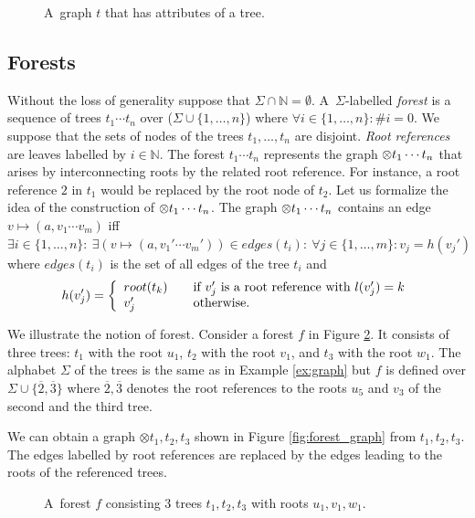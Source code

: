 	\begin{figure}[bth]
		\begin{center}
			
		\end{center}
		\caption{A~graph $t$ that has attributes of a tree.}
		\label{fig:graph_tree}
	\end{figure}
	\label{ex:graph}
\eexmp

\subsection{Forests}
\label{subsec:forests}

Without the loss of generality suppose that $\Sigma \cap \mathbb{N} = \emptyset$.
A~$\Sigma$-labelled \emph{forest} is a sequence of trees $t_1 \cdots t_n$ over ($\Sigma \cup \{1,\ldots,n\}$)
where $\forall i \in \{1,\ldots,n\}: \#i = 0$.
We suppose that the sets of nodes of the trees $t_1, \ldots, t_n$ are disjoint.
\emph{Root references} are leaves labelled by $i \in \mathbb{N}$.
The forest $t_1 \cdots t_n$ represents the graph $\otimes t_1 \cdots t_n$ that arises
by interconnecting roots by the related root reference.
For instance, a root reference $2$ in $t_1$ would be replaced by the root node of $t_2$.
Let us formalize the idea of the construction of $\otimes t_1 \cdots t_n$.
The graph $\otimes t_1 \cdots t_n$ contains an edge $v \mapsto (a,v_1 \cdots v_m)$ iff $\exists i \in \{1, \ldots, n\}:\ \exists(v \mapsto (a, v_1' \cdots v_m')) \in edges(t_i):
\ \forall j \in \{1,\ldots,m\}: v_j = h(v_j')$ where $edges(t_i)$ is the set of all edges of the tree $t_i$ and
\[ h(v_j') = \left\{
  \begin{array}{l l}
  root(t_k) & \quad \text{if $v_j'$ is a root reference with $l(v_j') = k$}\\
  v_j'   & \quad \text{otherwise.}
  \end{array} \right.\]

\pagebreak
\bexmp
We illustrate the notion of forest.
Consider a forest $f$ in Figure \ref{fig:forest}.
It consists of three trees: $t_1$ with the root $u_1$,
$t_2$ with the root $v_1$, and $t_3$ with the root $w_1$.
The alphabet $\Sigma$ of the trees is the same as in Example \ref{ex:graph} but $f$
is defined over $\Sigma \cup \{\overline{2}, \overline{3}\}$
where $\overline{2}, \overline{3}$ denotes the root references
to the roots $u_5$ and $v_3$ of the second and the third tree.

We can obtain a graph $\otimes t_1,t_2,t_3$ shown in Figure \ref{fig:forest_graph} from $t_1, t_2, t_3$.
The edges labelled by root references are replaced by the edges leading to the roots
of the referenced trees.
	\begin{figure}[bth]
	\begin{center}
		\scalebox{1}
		{
			
			\hspace{0.55cm}
			
			\hspace{0.55cm}
			
		}
		\caption{A~forest $f$ consisting 3 trees $t_1, t_2, t_3$ with roots $u_1, v_1, w_1$.}
	  \label{fig:forest}
	\end{center}
	\end{figure}

